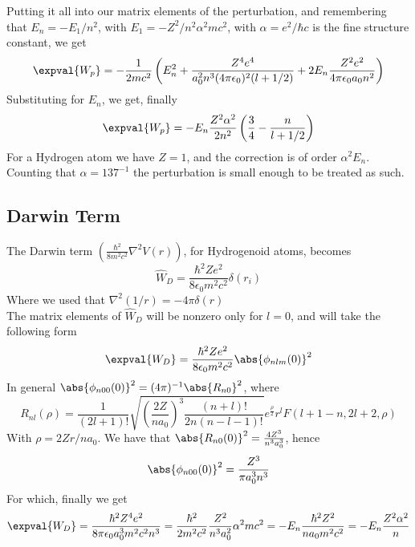 \documentclass[a4paper, 11pt]{book}
\newcommand{\1}{\opr{\mathds{1}}}
\newcommand{\opr}[1]{\hat{#1}}
\theoremstyle{plain}
\begin{document}
	Putting it all into our matrix elements of the perturbation, and remembering that $E_n=-E_1/n^2$, with $E_1=-Z^2/n^2\alpha^2mc^2$, with $\alpha=e^2/\hbar c$ is the fine structure constant, we get
	\begin{equation}
		\expval{W_p}=-\frac{1}{2mc^2}\left( E_n^2+\frac{Z^4e^4}{a_0^2n^3(4\pi\epsilon_0)^2(l+1/2)}+2E_n\frac{Z^2e^2}{4\pi\epsilon_0a_0n^2} \right)
		\label{eq:pertrelkinen}
	\end{equation}
	Substituting for $E_n$, we get, finally
	\begin{equation}
		\expval{W_p}=-E_n\frac{Z^2\alpha^2}{2n^2}\left( \frac{3}{4}-\frac{n}{l+1/2} \right)
		\label{eq:pertrelkinencomplete}
	\end{equation}
	For a Hydrogen atom we have $Z=1$, and the correction is of order $\alpha^2E_n$. Counting that $\alpha=137^{-1}$ the perturbation is small enough to be treated as such.\\
	\subsection{Darwin Term}
	The Darwin term $\left( \frac{\hbar^2}{8m^2c^2}\nabla^2V(r) \right)$, for Hydrogenoid atoms, becomes
	\begin{equation}
		\opr{W}_D=\frac{\hbar^2Ze^2}{8\epsilon_0m^2c^2}\delta(r_i)
		\label{eq:darwinterm}
	\end{equation}
	Where we used that $\nabla^2(1/r)=-4\pi\delta(r)$\\
	The matrix elements of $\opr{W}_D$ will be nonzero only for $l=0$, and will take the following form
	\begin{equation}
		\expval{W_D}=\frac{\hbar^2Ze^2}{8\epsilon_0m^2c^2}\abs{\phi_{nlm}(0)}^2
		\label{eq:darwinmatrixelements}
	\end{equation}
	In general $\abs{\phi_{n00}(0)}^2=(4\pi)^{-1}\abs{R_{n0}}^2$, where
	\begin{equation}
		R_{nl}(\rho)=\frac{1}{(2l+1)!}\sqrt{\left( \frac{2Z}{na_0} \right)^3\frac{(n+l)!}{2n(n-l-1)!}}e^{\frac{\rho}{2}}r^lF(l+1-n,2l+2,\rho)
		\label{eq:rnlgeneral}
	\end{equation}
	With $\rho=2Zr/na_0$. We have that $\abs{R_{n0}(0)}^2=\frac{4Z^3}{n^3a_0^3}$, hence
	\begin{equation}
		\abs{\phi_{n00}(0)}^2=\frac{Z^3}{\pi a_0^3n^3}
		\label{eq:phin00}
	\end{equation}
	For which, finally we get
	\begin{equation}
		\expval{W_D}=\frac{\hbar^2Z^4e^2}{8\pi\epsilon_0a_0^3m^2c^2n^3}=\frac{\hbar^2}{2m^2c^2}\frac{Z^2}{n^3a_0^2}\alpha^2mc^2=-E_n\frac{\hbar^2Z^2}{na_0m^2c^2}=-E_n\frac{Z^2\alpha^2}{n}
		\label{eq:darwintermpert}
	\end{equation}
\end{document}
